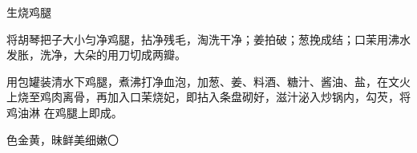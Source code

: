 \begin{recipe}{生烧鸡腿}

\ingredients


\cooking

\step 将胡琴把子大小匀净鸡腿，拈净残毛，淘洗干净；姜拍破；葱挽成结；口茉用沸水
发胀，洗净，大朵的用刀切成两瓣。

\step 用包罐装清水下鸡腿，煮沸打净血泡，加葱、姜、料酒、糖汁、酱油、盐，在文火
上烧至鸡肉离骨，再加入口茉烧妃，即拈入条盘砌好，滋汁泌入炒锅内，勾芡，将鸡油淋
在鸡腿上即成。

\features

色金黄，昧鲜美细嫩〇

\end{recipe}


